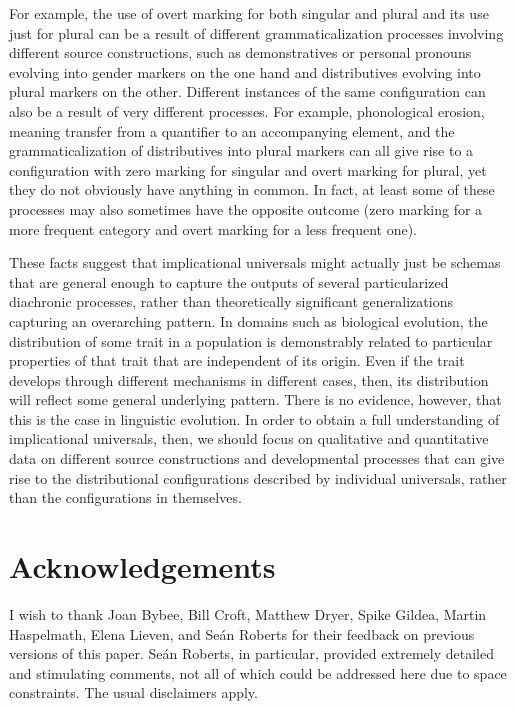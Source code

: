\documentclass[output=paper]{langsci/langscibook}
\begin{document}
For example, the use of overt marking for both
singular and plural and its use just for plural can be a result of
different grammaticalization  processes involving different source
constructions, such as demonstratives or personal pronouns evolving
into gender  markers on the one hand and distributives evolving into
plural markers on the other. Different instances of
the same configuration can also be a result of very different processes. For
example, phonological erosion, meaning transfer from a
quantifier to an accompanying element, and the grammaticalization of
distributives into plural markers can all give rise to a configuration with
zero marking for singular and overt marking for plural, yet they do
not obviously have anything in common.  In fact, at least some of
these processes may also sometimes have the opposite outcome (zero marking for a more
frequent category and overt marking for a less frequent one).

These facts suggest that implicational universals might actually 
just be schemas that are general enough to capture the outputs of
several particularized  diachronic 
processes, rather than theoretically significant generalizations
capturing an
overarching pattern. In domains such as biological evolution,  the distribution of
some trait in a population is demonstrably  related to
particular properties of that trait that are independent of its
origin. Even if the trait develops through
different mechanisms in different cases, then, its distribution will
reflect some general underlying pattern.  There is no evidence, however, that this is the case in
linguistic evolution.  In order to obtain a full understanding of
implicational universals, then, we should  focus on qualitative and
  quantitative data on different source constructions and developmental
  processes that can give rise to the distributional configurations described by individual
  universals, rather than  the configurations in themselves.

 
 \largerpage
\section*{Acknowledgements}
 I wish to thank Joan Bybee, Bill Croft,
Matthew Dryer, Spike Gildea, Martin Haspelmath, Elena Lieven, and
Seán Roberts for their feedback on previous versions of this
paper. Seán Roberts, in particular, provided extremely detailed and
stimulating comments, not all of which could be addressed here due to
space constraints. The usual disclaimers apply.
\end{document}
